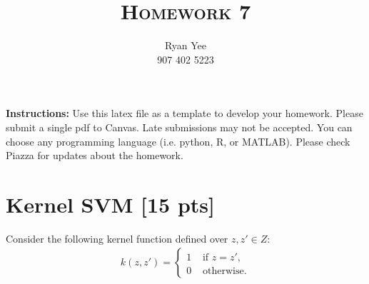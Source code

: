 \documentclass[a4paper]{article}
\title{\textsc{Homework 7}} %
\author{
    Ryan Yee \\
	907 402 5223 \\
}
\date{}
\theoremstyle{definition}
\begin{document}
\maketitle 

\textbf{Instructions:}
Use this latex file as a template to develop your homework. Please submit a single pdf to Canvas. Late submissions may not be accepted. You can choose any programming language (i.e. python, R, or MATLAB). Please check Piazza for updates about the homework.
\vspace{0.1in}

\section{Kernel SVM [15 pts]}
Consider the following kernel function defined over $z,z'\in Z$:
\begin{align*}
k(z,z') =
\begin{cases}
1 & \text{~if~} z=z', \\
0 & \text{~otherwise.}
\end{cases}
\end{align*}
\end{document}
